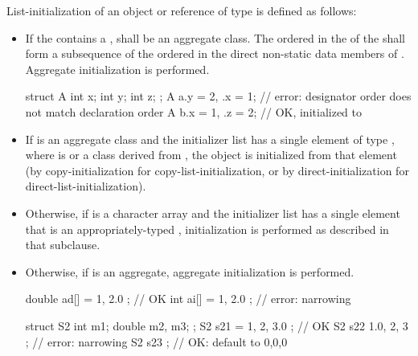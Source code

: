 \pnum
List-initialization of an object or reference of type  is defined as follows:
\begin{itemize}
\item
If the 
contains a ,
 shall be an aggregate class.
The ordered 
in the 
of the 
shall form a subsequence
of the ordered 
in the direct non-static data members of .
Aggregate initialization is performed.
\begin{example}
\begin{codeblock}
struct A { int x; int y; int z; };
A a{.y = 2, .x = 1};                // error: designator order does not match declaration order
A b{.x = 1, .z = 2};                // OK,  initialized to 
\end{codeblock}
\end{example}

\item If  is an aggregate class and the initializer list has a single element
of type  ,
where  is  or a class derived from ,
the object is initialized from that element (by copy-initialization for
copy-list-initialization, or by direct-initialization for
direct-list-initialization).

\item Otherwise, if  is a character array and the initializer list has a
single element that is an appropriately-typed ,
initialization is performed as described in that subclause.

\item Otherwise, if  is an aggregate, aggregate initialization is
performed.

\begin{example}
\begin{codeblock}
double ad[] = { 1, 2.0 };           // OK
int ai[] = { 1, 2.0 };              // error: narrowing

struct S2 {
  int m1;
  double m2, m3;
};
S2 s21 = { 1, 2, 3.0 };             // OK
S2 s22 { 1.0, 2, 3 };               // error: narrowing
S2 s23 { };                         // OK: default to 0,0,0
\end{codeblock}
\end{example}


\end{itemize}

